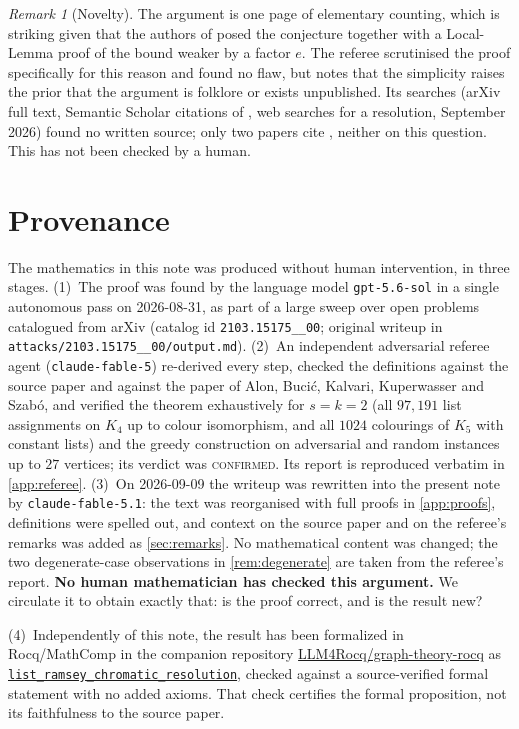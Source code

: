 \documentclass[11pt,a4paper]{article}
\theoremstyle{plain}
\theoremstyle{definition}
\theoremstyle{remark}
\newtheorem{remark}[theorem]{Remark}
\begin{document}
\begin{remark}[Novelty]
The argument is one page of elementary counting, which is striking given that the authors of \cite{FHLX21} posed the conjecture together with a Local-Lemma proof of the bound weaker by a factor $e$. The referee scrutinised the proof specifically for this reason and found no flaw, but notes that the simplicity raises the prior that the argument is folklore or exists unpublished. Its searches (arXiv full text, Semantic Scholar citations of \cite{FHLX21}, web searches for a resolution, September 2026) found no written source; only two papers cite \cite{FHLX21}, neither on this question. This has not been checked by a human.
\end{remark}

\section{Provenance}\label{sec:provenance}

The mathematics in this note was produced without human intervention, in three stages.
(1)~The proof was found by the language model \texttt{gpt-5.6-sol} in a single autonomous pass on 2026-08-31, as part of a large sweep over open problems catalogued from arXiv (catalog id \texttt{2103.15175\_\_00}; original writeup in \texttt{attacks/2103.15175\_\_00/output.md}).
(2)~An independent adversarial referee agent (\texttt{claude-fable-5}) re-derived every step, checked the definitions against the source paper and against the paper of Alon, Bucić, Kalvari, Kuperwasser and Szabó, and verified the theorem exhaustively for $s=k=2$ (all $97{,}191$ list assignments on $K_4$ up to colour isomorphism, and all $1024$ colourings of $K_5$ with constant lists) and the greedy construction on adversarial and random instances up to $27$ vertices; its verdict was \textsc{confirmed}. Its report is reproduced verbatim in \cref{app:referee}.
(3)~On 2026-09-09 the writeup was rewritten into the present note by \texttt{claude-fable-5.1}: the text was reorganised with full proofs in \cref{app:proofs}, definitions were spelled out, and context on the source paper and on the referee's remarks was added as \cref{sec:remarks}. No mathematical content was changed; the two degenerate-case observations in \cref{rem:degenerate} are taken from the referee's report.
\textbf{No human mathematician has checked this argument.} We circulate it to obtain exactly that: is the proof correct, and is the result new?

 (4)~Independently of this note, the result has been formalized in Rocq/MathComp in the companion repository \href{https://github.com/LLM4Rocq/graph-theory-rocq}{LLM4Rocq/graph-theory-rocq} as \href{https://github.com/LLM4Rocq/graph-theory-rocq/blob/main/extremal-graph-theory/theories/applications/list_ramsey_graph.v}{\texttt{list\_ramsey\_chromatic\_resolution}}, checked against a source-verified formal statement with no added axioms. That check certifies the formal proposition, not its faithfulness to the source paper.
\end{document}
